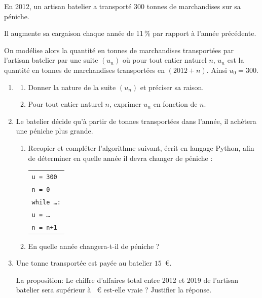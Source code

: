 \medskip

En 2012, un artisan batelier a transporté $300$ tonnes de marchandises sur sa péniche.

Il augmente sa cargaison chaque année de 11\,\% par rapport à l'année précédente.

\smallskip

On modélise alors la quantité en tonnes de marchandises transportées par l'artisan batelier par une suite $\left(u_n\right)$ où pour tout entier naturel $n$, $u_n$ est la quantité en tonnes de marchandises transportées en $(2012 + n)$. Ainsi $u_0 = 300$.

\medskip

\begin{enumerate}
\item 
	\begin{enumerate}
		\item Donner la nature de la suite $\left(u_n\right)$ et préciser sa raison. 
		\item Pour tout entier naturel $n$, exprimer $u_n$ en fonction de $n$.
	\end{enumerate}
\item Le batelier décide qu'à partir de  tonnes transportées dans l'année, il achètera une péniche plus grande.
	\begin{enumerate}
		\item Recopier et compléter l'algorithme suivant, écrit en langage Python, afin de déterminer en quelle année il devra changer de péniche :
		
\begin{center}
\begin{tabular}{|l|}\hline
\texttt{u = 300}\\
\texttt{n = 0}\\
\texttt{while \ldots :}\\
\qquad \texttt{u = \ldots}\\
\qquad  \texttt{n = n+1}\\ \hline
\end{tabular}
\end{center}

		\item En quelle année changera-t-il de péniche ?
	\end{enumerate}
\item Une tonne transportée est payée au batelier $15$~\euro.

La proposition: \og Le chiffre d'affaires total entre 2012 et 2019 de l'artisan batelier sera
supérieur à ~\euro{} \fg{} est-elle vraie ? Justifier la réponse.
\end{enumerate}
